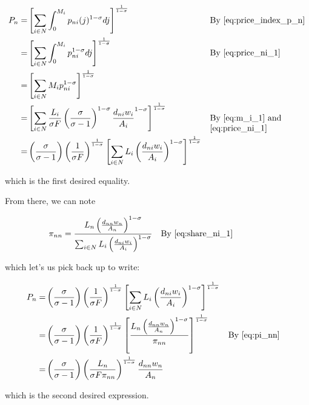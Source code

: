 \documentclass[10pt]{article}
\begin{document}
\begin{align}
    P_n = &\left[\sum_{i \in N} \int_0^{M_i} p_{n i}(j)^{1-\sigma} d j\right]^{\frac{1}{1-\sigma}} && \parbox[t]{4cm}{\raggedright By \eqref{eq:price_index_p_n}} \\
    = &\left[\sum_{i \in N} \int_0^{M_i} p_{n i}^{1-\sigma} d j\right]^{\frac{1}{1-\sigma}} && \parbox[t]{4cm}{\raggedright By \eqref{eq:price_ni_1}} \\
    = &\left[\sum_{i \in N} M_i p_{n i}^{1-\sigma}\right]^{\frac{1}{1-\sigma}} \\
    = &\left[\sum_{i \in N} \frac{L_i}{\sigma F} \left(\frac{\sigma}{\sigma-1}\right)^{1-\sigma} \frac{d_{ni} w_i}{A_i}^{1-\sigma}\right]^{\frac{1}{1-\sigma}} && \parbox[t]{4cm}{\raggedright By \eqref{eq:m_i_1} and \eqref{eq:price_ni_1}} \\
    = &\left(\frac{\sigma}{\sigma-1}\right) \left(\frac{1}{\sigma F}\right)^{\frac{1}{1-\sigma}} \left[\sum_{i \in N} L_i \left(\frac{d_{ni} w_i}{A_i}\right)^{1-\sigma}\right]^{\frac{1}{1-\sigma}} \\
\end{align}

which is the first desired equality. 

From there, we can note

\begin{align}
    \pi_{nn} &= \frac{L_n \left(\frac{d_{nn} w_n}{A_n}\right)^{1-\sigma}}{\sum_{i \in N} L_i \left(\frac{d_{ni} w_i}{A_i}\right)^{1-\sigma}} && \parbox[t]{4cm}{\raggedright By \eqref{eq:share_ni_1}} \label{eq:pi_nn}
\end{align}

which let's us pick back up to write:

\begin{align}
    P_n = &\left(\frac{\sigma}{\sigma-1}\right) \left(\frac{1}{\sigma F}\right)^{\frac{1}{1-\sigma}} \left[\sum_{i \in N} L_i \left(\frac{d_{ni} w_i}{A_i}\right)^{1-\sigma}\right]^{\frac{1}{1-\sigma}} \\
    = &\left(\frac{\sigma}{\sigma-1}\right) \left(\frac{1}{\sigma F}\right)^{\frac{1}{1-\sigma}} \left[\frac{L_n \left(\frac{d_{nn} w_n}{A_n}\right)^{1-\sigma}}{\pi_{nn}}\right]^{\frac{1}{1-\sigma}} && \text{By \eqref{eq:pi_nn}} \\
    = &\left(\frac{\sigma}{\sigma-1}\right) \left(\frac{L_n}{\sigma F \pi_{nn}}\right)^{\frac{1}{1-\sigma}} \frac{d_{nn} w_n}{A_n}
\end{align}

which is the second desired expression.
\end{document}
